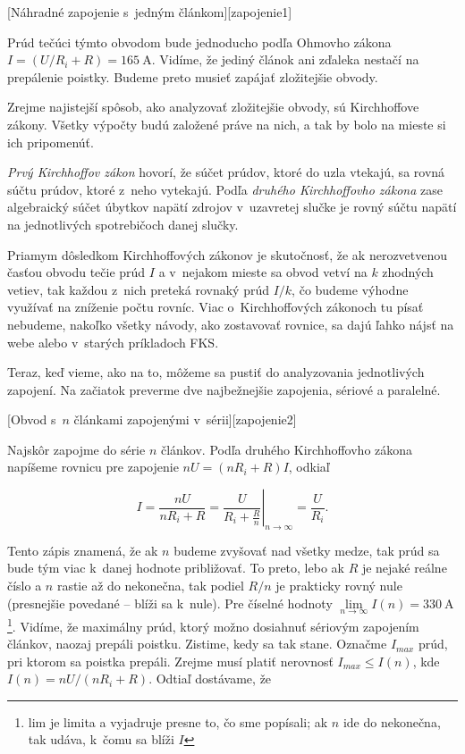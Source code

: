 [Náhradné zapojenie s~jedným článkom][zapojenie1]

Prúd tečúci týmto obvodom bude jednoducho podľa Ohmovho zákona $I=(U/R_{i}+R)=\SI{165}{\ampere}$.
Vidíme, že jediný článok ani zďaleka nestačí na prepálenie poistky.
Budeme preto musieť zapájať zložitejšie obvody.

Zrejme najistejší spôsob, ako analyzovať zložitejšie obvody, sú Kirchhoffove
zákony. Všetky výpočty budú založené práve na nich, a tak by bolo
na mieste si ich pripomenúť. 

\emph{Prvý Kirchhoffov zákon} hovorí, že súčet
prúdov, ktoré do uzla vtekajú, sa rovná súčtu prúdov, ktoré z~neho
vytekajú. Podľa \emph{druhého Kirchhoffovho zákona} zase algebraický súčet
úbytkov napätí zdrojov v~uzavretej slučke je rovný súčtu napätí na
jednotlivých spotrebičoch danej slučky. 

Priamym dôsledkom Kirchhoffových
zákonov je skutočnosť, že ak nerozvetvenou časťou obvodu tečie prúd
$I$ a v~nejakom mieste sa obvod vetví na $k$ zhodných vetiev, tak
každou z~nich preteká rovnaký prúd $I/k$, čo budeme výhodne
využívať na zníženie počtu rovníc. Viac o~Kirchhoffových zákonoch
tu písať nebudeme, nakoľko všetky návody, ako zostavovať rovnice,
sa dajú ľahko nájsť na webe alebo v~starých príkladoch FKS.

Teraz, keď vieme, ako na to, môžeme sa pustiť do analyzovania jednotlivých
zapojení. Na začiatok preverme dve najbežnejšie zapojenia, sériové
a paralelné.

[Obvod s~$n$ článkami zapojenými v~sérii][zapojenie2]

Najskôr zapojme do série $n$ článkov. Podľa druhého Kirchhoffovho zákona napíšeme rovnicu
pre zapojenie $nU=\left(nR_{i}+R\right)I$, odkiaľ

$$I=\frac{nU}{nR_{i}+R}=\left.\frac{U}{R_{i}+\frac{R}{n}}\right|_{n\rightarrow\infty}=\frac{U}{R_{i}}\text{.}$$

Tento zápis znamená, že ak $n$ budeme zvyšovať nad všetky medze,
tak prúd sa bude tým viac k~danej hodnote približovať. To preto, lebo
ak $R$ je nejaké reálne číslo a $n$ rastie až do nekonečna, tak
podiel $R/n$ je prakticky rovný nule (presnejšie povedané --
blíži sa k~nule). Pre číselné hodnoty $\underset{n\rightarrow\infty}{\lim}I\left(n\right)=\SI{330}{\ampere}$\footnote{lim je limita a vyjadruje presne to, čo sme popísali; ak $n$ ide
do nekonečna, tak udáva, k~čomu sa blíži $I$}. Vidíme, že maximálny prúd, ktorý možno dosiahnuť sériovým zapojením
článkov, naozaj prepáli poistku. Zistime, kedy sa tak stane. Označme
$I_{max}$ prúd, pri ktorom sa poistka prepáli. Zrejme musí platiť
nerovnosť $I_{max}\leq I\left(n\right)$, kde $I\left(n\right)=nU/(nR_{i}+R)$.
Odtiaľ dostávame, že 

